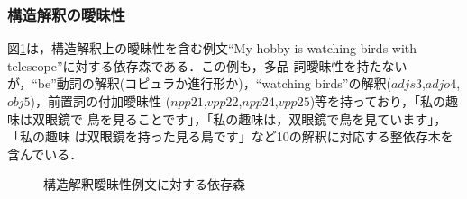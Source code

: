 \begin{comment}

同値アーク [[(22),23],[(9),10],[(6),7],[(18),19,20],[(14),15,16]]
最終アーク 25,12, 4, 2,22, 9, 6,18,14,26
-----
dgarc(and-25,[earth]-n-0,[ganymede]-n-6)
dgarc(and-12,[earth]-n-0,[jupitor]-n-4)
dgarc(and-4,[earth]-n-0,[moon]-n-2)
dgarc(cnj-2,[and]-and-1,[earth]-n-0)
dgarc(or-22,[moon]-n-2,[ganymede]-n-6)
dgarc(or-9,[moon]-n-2,[jupitor]-n-4)
dgarc(cnj-6,[or]-or-3,[moon]-n-2)
dgarc(and-18,[jupitor]-n-4,[ganymede]-n-6)
dgarc(cnj-14,[and]-and-5,[jupitor]-n-4)
dgarc(root-26,[ganymede]-n-6,[root]-x-root)
×dgarc(or-23,[moon]-n-2,[ganymede]-n-6)
×dgarc(or-10,[moon]-n-2,[jupitor]-n-4)
×dgarc(cnj-7,[or]-or-3,[moon]-n-2)
×dgarc(and-19,[jupitor]-n-4,[ganymede]-n-6)
×dgarc(and-20,[jupitor]-n-4,[ganymede]-n-6)
×dgarc(cnj-15,[and]-and-5,[jupitor]-n-4)
×dgarc(cnj-16,[and]-and-5,[jupitor]-n-4)

====== Number of various trees ========
[Parse Forest]
(a) Parse Forest Size : 18
(b) Number of collection of parse trees : 5
(c) Number of set of parse trees : 5
[Dependency Forest]
(I-1) Initial DF size : 17
(I-2) Initial DF ID-tree collection number : 5
(I-3) Initial DF ID-tree set number : 5
(I-4) Initial DF Generalized-tree number : 5
(R-1) Reduced DF size : 10
(R-2) Reduced DF ID-tree collection number : 5
(R-3) Reduced DF ID-tree set number : 5
(R-4) Reduced DF Generalized-tree number : 5

\end{comment}

\subsubsection{構造解釈の曖昧性}\label{sec:AmbiguityInStructuralInterpertation}

図\ref{fig:DFForMyHobbyIs}は，構造解釈上の曖昧性を含む例文``My hobby
is watching birds with telescope''に対する依存森である．この例も，多品
詞曖昧性を持たないが，``be''動詞の解釈(コピュラか進行形か)，``watching
birds''の解釈($adjs3$,$adjo4$,$obj5$)，前置詞の付加曖昧性
($npp21$,$vpp22$,$npp24$,$vpp25$)等を持っており，「私の趣味は双眼鏡で
鳥を見ることです」，「私の趣味は，双眼鏡で鳥を見ています」，「私の趣味
は双眼鏡を持った見る鳥です」など10の解釈に対応する整依存木を含んでいる．

\begin{figure}[tb]
\begin{center}
\end{center}
\myfiglabelskip
\caption{構造解釈曖昧性例文に対する依存森}
\label{fig:DFForMyHobbyIs}
\end{figure}

